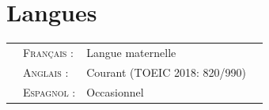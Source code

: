 \documentclass[a4paper,10pt]{article}
\begin{document}
\section{Langues}
\begin{flushleft}
\begin{tabular}{p{0.4cm}lll}
&\textsc{Français :}&Langue maternelle\\
&\textsc{Anglais :}&Courant (TOEIC 2018: 820/990)\\
&\textsc{Espagnol :}&Occasionnel
\end{tabular}
\end{flushleft}

\end{document}
